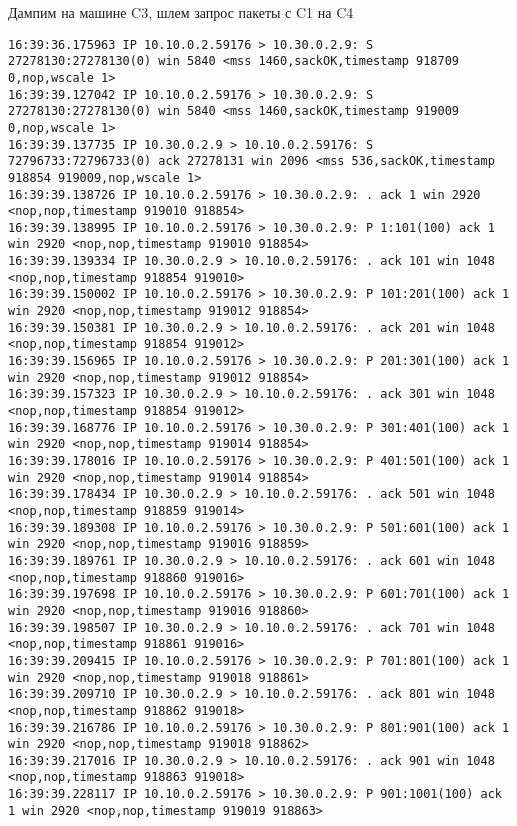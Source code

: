 \documentclass[a4paper,12pt]{article}
\begin{document}
Дампим на машине C3, шлем запрос пакеты с C1 на C4

\begin{Verbatim}
16:39:36.175963 IP 10.10.0.2.59176 > 10.30.0.2.9: S 27278130:27278130(0) win 5840 <mss 1460,sackOK,timestamp 918709 0,nop,wscale 1>
16:39:39.127042 IP 10.10.0.2.59176 > 10.30.0.2.9: S 27278130:27278130(0) win 5840 <mss 1460,sackOK,timestamp 919009 0,nop,wscale 1>
16:39:39.137735 IP 10.30.0.2.9 > 10.10.0.2.59176: S 72796733:72796733(0) ack 27278131 win 2096 <mss 536,sackOK,timestamp 918854 919009,nop,wscale 1>
16:39:39.138726 IP 10.10.0.2.59176 > 10.30.0.2.9: . ack 1 win 2920 <nop,nop,timestamp 919010 918854>
16:39:39.138995 IP 10.10.0.2.59176 > 10.30.0.2.9: P 1:101(100) ack 1 win 2920 <nop,nop,timestamp 919010 918854>
16:39:39.139334 IP 10.30.0.2.9 > 10.10.0.2.59176: . ack 101 win 1048 <nop,nop,timestamp 918854 919010>
16:39:39.150002 IP 10.10.0.2.59176 > 10.30.0.2.9: P 101:201(100) ack 1 win 2920 <nop,nop,timestamp 919012 918854>
16:39:39.150381 IP 10.30.0.2.9 > 10.10.0.2.59176: . ack 201 win 1048 <nop,nop,timestamp 918854 919012>
16:39:39.156965 IP 10.10.0.2.59176 > 10.30.0.2.9: P 201:301(100) ack 1 win 2920 <nop,nop,timestamp 919012 918854>
16:39:39.157323 IP 10.30.0.2.9 > 10.10.0.2.59176: . ack 301 win 1048 <nop,nop,timestamp 918854 919012>
16:39:39.168776 IP 10.10.0.2.59176 > 10.30.0.2.9: P 301:401(100) ack 1 win 2920 <nop,nop,timestamp 919014 918854>
16:39:39.178016 IP 10.10.0.2.59176 > 10.30.0.2.9: P 401:501(100) ack 1 win 2920 <nop,nop,timestamp 919014 918854>
16:39:39.178434 IP 10.30.0.2.9 > 10.10.0.2.59176: . ack 501 win 1048 <nop,nop,timestamp 918859 919014>
16:39:39.189308 IP 10.10.0.2.59176 > 10.30.0.2.9: P 501:601(100) ack 1 win 2920 <nop,nop,timestamp 919016 918859>
16:39:39.189761 IP 10.30.0.2.9 > 10.10.0.2.59176: . ack 601 win 1048 <nop,nop,timestamp 918860 919016>
16:39:39.197698 IP 10.10.0.2.59176 > 10.30.0.2.9: P 601:701(100) ack 1 win 2920 <nop,nop,timestamp 919016 918860>
16:39:39.198507 IP 10.30.0.2.9 > 10.10.0.2.59176: . ack 701 win 1048 <nop,nop,timestamp 918861 919016>
16:39:39.209415 IP 10.10.0.2.59176 > 10.30.0.2.9: P 701:801(100) ack 1 win 2920 <nop,nop,timestamp 919018 918861>
16:39:39.209710 IP 10.30.0.2.9 > 10.10.0.2.59176: . ack 801 win 1048 <nop,nop,timestamp 918862 919018>
16:39:39.216786 IP 10.10.0.2.59176 > 10.30.0.2.9: P 801:901(100) ack 1 win 2920 <nop,nop,timestamp 919018 918862>
16:39:39.217016 IP 10.30.0.2.9 > 10.10.0.2.59176: . ack 901 win 1048 <nop,nop,timestamp 918863 919018>
16:39:39.228117 IP 10.10.0.2.59176 > 10.30.0.2.9: P 901:1001(100) ack 1 win 2920 <nop,nop,timestamp 919019 918863>

\end{Verbatim}
\end{document}
